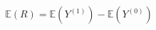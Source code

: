 \documentclass[preview]{standalone}
\begin{document}
\begin{align*}
\mathbb{E}(R) = \mathbb{E}(Y^{(1)}) - \mathbb{E}(Y^{(0)})
\end{align*}
\end{document}
